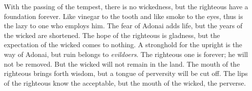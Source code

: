 \begin{biblechapter}
\verse With the passing of the tempest, there is no wickedness, 
but the righteous have a foundation forever.
\verse Like vinegar to the tooth and like smoke to the eyes, 
thus is the lazy to one who employs him.
\verse The fear of Adonai adds life, 
but the years of the wicked are shortened.
\verse The hope of the righteous is gladness, 
but the expectation of the wicked comes to nothing.
\verse A stronghold for the upright is the way of Adonai, 
but ruin belongs to \textit{evildoers}.
\verse The righteous one is forever; he will not be removed. 
But the wicked will not remain in the land.
\verse The mouth of the righteous brings forth wisdom, 
but a tongue of perversity will be cut off.
\verse The lips of the righteous know the acceptable, 
but the mouth of the wicked, the perverse.
\end{biblechapter}


